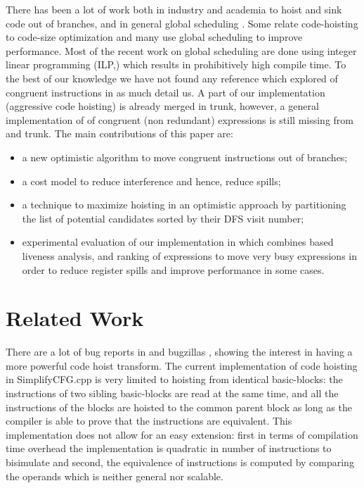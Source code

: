 \documentclass[acmlarge,review,anonymous]{acmart}\settopmatter{printfolios=true}
\begin{document}
There has been a lot of work both in industry and academia to hoist and sink
code out of branches, and in general global scheduling
\cite{click1995global}. Some relate code-hoisting to code-size optimization
\cite{rosen1988global} and many \cite{barany2013, shobaki2013} use global
scheduling to improve performance. Most of the recent work on global scheduling
are done using integer linear programming (ILP,) which results in prohibitively
high compile time. To the best of our knowledge we have not found any reference
which explored \gcm{} of congruent instructions in as much detail us. A part of
our implementation (aggressive code hoisting) is already merged
in \LLVM{} trunk, however, a general implementation of \gcm{} of congruent (non
redundant) expressions is still missing from \GCC{} and \LLVM{} trunk. The main
contributions of this paper are:
\begin{itemize}
\item a new optimistic algorithm to move congruent instructions out of branches;
\item a cost model to reduce interference and hence, reduce spills;
\item a technique to maximize hoisting in an optimistic approach by partitioning
  the list of potential candidates sorted by their DFS visit number;
\item experimental evaluation of our implementation in \LLVM{} which combines
  \SSA{} based liveness analysis, and ranking of expressions to move very busy
  expressions in order to reduce register spills and improve performance in some
  cases.
\end{itemize}

\section{Related Work}

There are a lot of bug reports in \GCC{} and \LLVM{} bugzillas
\cite{GCCCodeHoistingBugs, LLVMCodeHoistingBugs}, showing the interest in having
a more powerful code hoist transform.  The current \LLVM{} implementation of
code hoisting in SimplifyCFG.cpp is very limited to hoisting from identical
basic-blocks: the instructions of two sibling basic-blocks are read at the same
time, and all the instructions of the blocks are hoisted to the common parent
block as long as the compiler is able to prove that the instructions are
equivalent.  This implementation does not allow for an easy extension: first in
terms of compilation time overhead the implementation is quadratic in number of
instructions to bisimulate and second, the equivalence of instructions is
computed by comparing the operands which is neither general nor scalable.
\end{document}
